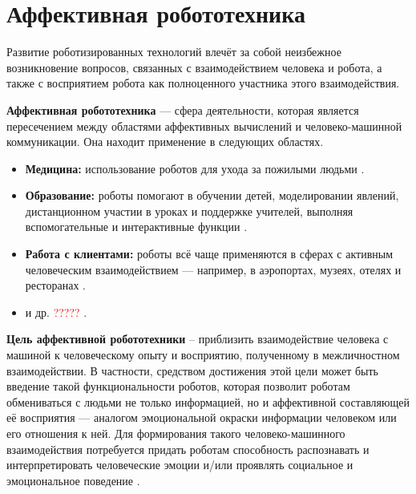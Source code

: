 \chapter{Аффективная робототехника}

Развитие роботизированных технологий влечёт за собой неизбежное возникновение вопросов, связанных с взаимодействием человека и робота, а также с восприятием робота как полноценного участника этого взаимодействия.


\textbf{Аффективная робототехника} --- сфера деятельности, которая является пересечением между областями аффективных вычислений и человеко-машинной коммуникации. Она находит применение в следующих областях. 

\begin{itemize}
	\item \textbf{Медицина:} использование роботов для ухода за пожилыми людьми \cite{affect-rob-in-med, affect-rob-in-med-2}.
	
	\item \textbf{Образование:} роботы помогают в обучении детей, моделировании явлений, дистанционном участии в уроках и поддержке учителей, выполняя вспомогательные и интерактивные функции \cite{affect-rob-in-edu}.
	
	\item \textbf{Работа с клиентами:} роботы всё чаще применяются в сферах с активным человеческим взаимодействием — например, в аэропортах, музеях, отелях и ресторанах \cite{affect-rob-in-serv}.
	
	\item и др. \textcolor{red}{?????} \cite{affect-rob-in-other-fields}.
\end{itemize}


\textbf{Цель аффективной робототехники} -- приблизить взаимодействие человека с машиной к человеческому опыту и восприятию, полученному в межличностном взаимодействии. В частности, средством достижения этой цели может быть введение такой функциональности роботов, которая позволит роботам обмениваться с людьми не только информацией, но и аффективной составляющей её восприятия --- аналогом эмоциональной окраски информации человеком или его отношения к ней. Для формирования такого человеко-машинного взаимодействия потребуется придать роботам способность распознавать и интерпретировать человеческие эмоции и/или проявлять социальное и эмоциональное поведение \cite{affect-rob-goal}.


